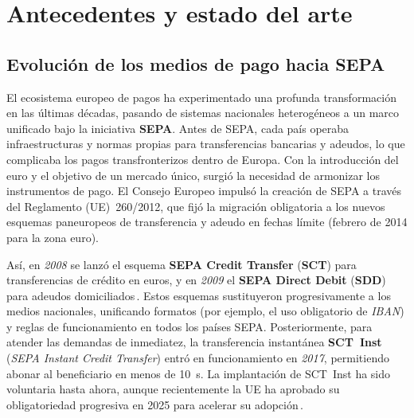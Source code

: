 
\section{Antecedentes y estado del arte}
\label{sec:estado-arte}

\subsection{Evolución de los medios de pago hacia SEPA}
\label{subsec:evolucion-sepa}


El ecosistema europeo de pagos ha experimentado una profunda transformación en las últimas décadas, pasando de sistemas nacionales heterogéneos a un marco unificado bajo la iniciativa \textbf{SEPA}. Antes de SEPA, cada país operaba infraestructuras y normas propias para transferencias bancarias y adeudos, lo que complicaba los pagos transfronterizos dentro de Europa.  
Con la introducción del euro y el objetivo de un mercado único, surgió la necesidad de armonizar los instrumentos de pago. El Consejo Europeo impulsó la creación de SEPA a través del Reglamento (UE)~\num{260}/\num{2012}, que fijó la migración obligatoria a los nuevos esquemas paneuropeos de transferencia y adeudo en fechas límite (febrero de 2014 para la zona euro).  

Así, en \textit{2008} se lanzó el esquema \textbf{SEPA Credit Transfer} (\textbf{SCT}) para transferencias de crédito en euros, y en \textit{2009} el \textbf{SEPA Direct Debit} (\textbf{SDD}) para adeudos domiciliados\,\cite{Numeral2022}. Estos esquemas sustituyeron progresivamente a los medios nacionales, unificando formatos (por ejemplo, el uso obligatorio de \emph{IBAN}) y reglas de funcionamiento en todos los países SEPA. Posteriormente, para atender las demandas de inmediatez, la transferencia instantánea \textbf{SCT~Inst} (\emph{SEPA Instant Credit Transfer}) entró en funcionamiento en \textit{2017}, permitiendo abonar al beneficiario en menos de \SI{10}{\second}. La implantación de SCT~Inst ha sido voluntaria hasta ahora, aunque recientemente la UE ha aprobado su obligatoriedad progresiva en 2025 para acelerar su adopción\,\cite{CBI2024}.  


